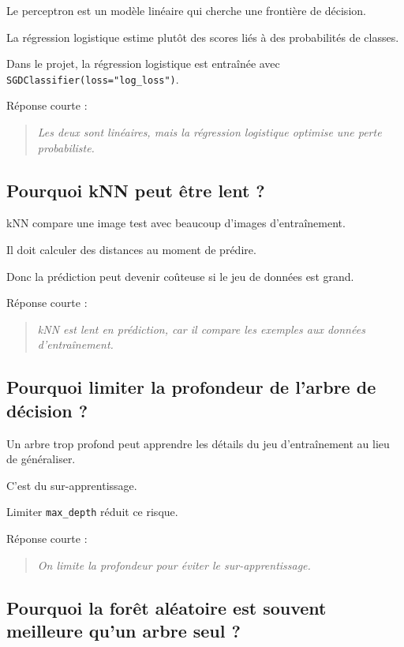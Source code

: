 \documentclass[11pt,a4paper]{article}
\begin{document}
Le perceptron est un modèle linéaire qui cherche une frontière de décision.

La régression logistique estime plutôt des scores liés à des probabilités de classes.

Dans le projet, la régression logistique est entraînée avec \texttt{SGDClassifier(loss="log\_loss")}.

Réponse courte :

\begin{quote}
\itshape Les deux sont linéaires, mais la régression logistique optimise une perte probabiliste.
\end{quote}

\subsection{Pourquoi kNN peut être lent ?}

kNN compare une image test avec beaucoup d'images d'entraînement.

Il doit calculer des distances au moment de prédire.

Donc la prédiction peut devenir coûteuse si le jeu de données est grand.

Réponse courte :

\begin{quote}
\itshape kNN est lent en prédiction, car il compare les exemples aux données d'entraînement.
\end{quote}

\subsection{Pourquoi limiter la profondeur de l'arbre de décision ?}

Un arbre trop profond peut apprendre les détails du jeu d'entraînement au lieu de généraliser.

C'est du sur-apprentissage.

Limiter \texttt{max\_depth} réduit ce risque.

Réponse courte :

\begin{quote}
\itshape On limite la profondeur pour éviter le sur-apprentissage.
\end{quote}

\subsection{Pourquoi la forêt aléatoire est souvent meilleure qu'un arbre seul ?}
\end{document}
